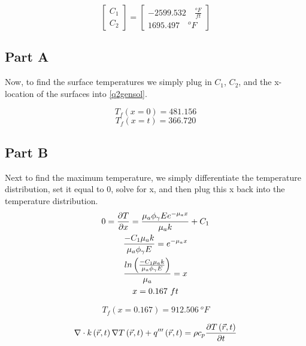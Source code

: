 \documentclass{article}
\begin{document}
\begin{equation}
    \begin{bmatrix}
        C_1 \\ C_2
    \end{bmatrix}
     = 
     \begin{bmatrix}
         -2599.532 \quad \frac{^oF}{ft}\\ 1695.497  \quad ^oF
     \end{bmatrix}
\end{equation}


\subsection*{Part A}
Now, to find the surface temperatures we simply plug in $C_1$, $C_2$, and the x-location of the surfaces into \eqref{q2gensol}. 

\[
\boxed{T_f(x = 0) = 481.156} \]\[
\boxed{T_f(x = t) = 366.720}
\]

\subsection*{Part B}
Next to find the maximum temperature, we simply differentiate the temperature distribution, set it equal to 0, solve for x, and then plug this x back into the temperature distribution. 
\begin{equation}
    \begin{gathered}
        0 = \frac{\partial T}{\partial x} = \frac{\mu_a \phi_{\gamma} E e^{-\mu_a x}}{\mu_ak}+C_1 \\
    \frac{-C_1 \mu_a k}{\mu_a \phi_{\gamma} E} = e^{-\mu_a x} \\
    \frac{ln\left(\frac{-C_1 \mu_a k}{\mu_a \phi_{\gamma} E}\right)}{\mu_a} = x \\
    x = 0.167 \ ft
    \end{gathered}
\end{equation}    

\[
\boxed{T_f(x = 0.167) = 912.506 \ ^oF}
\]











\newpage
{}
\begin{equation}
    \nabla \cdot k\left(\Vec{r},t\right) \nabla T \left(\Vec{r},t\right) + q'''\left(\Vec{r},t\right) = \rho c_p \frac{\partial T \left(\Vec{r},t\right)}{\partial t}
\end{equation}
\end{document}
